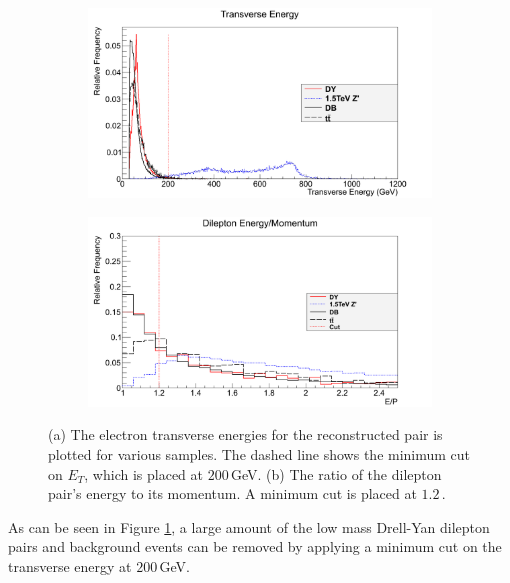 \documentclass{article}
\begin{document}
\begin{figure}[h]
    \centering
    \begin{subfigure}{.49\textwidth}
        \includegraphics[height=0.6\textwidth]{images/variables/Et.png}
        \caption{}
        \label{fig:Et}
    \end{subfigure}
    \begin{subfigure}{.49\textwidth}
        \includegraphics[height=0.6\textwidth]{images/variables/EP.png}
        \caption{}
        \label{fig:EP}
    \end{subfigure}
    \caption{(a) The electron transverse energies for the reconstructed pair is plotted for various samples. The dashed line shows the minimum cut on $E_T$, which is placed at $200\,$GeV. (b) The ratio of the dilepton pair's energy to its momentum. A minimum cut is placed at $1.2\,$.\label{fig:EtEP}}
\end{figure}

As can be seen in Figure \ref{fig:Et}, a large amount of the low mass Drell-Yan dilepton pairs and background events can be removed by applying a minimum cut on the transverse energy at $200\,$GeV. 
\end{document}
